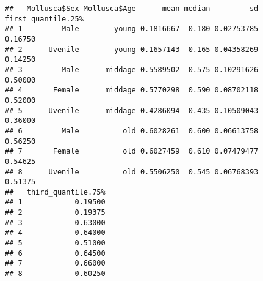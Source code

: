 \documentclass[
]{article}
\newenvironment{Shaded}{\begin{snugshade}}{\end{snugshade}}
\newcommand{\ControlFlowTok}[1]{\textcolor[rgb]{0.13,0.29,0.53}{\textbf{#1}}}
\newcommand{\DataTypeTok}[1]{\textcolor[rgb]{0.13,0.29,0.53}{#1}}
\newcommand{\FloatTok}[1]{\textcolor[rgb]{0.00,0.00,0.81}{#1}}
\newcommand{\KeywordTok}[1]{\textcolor[rgb]{0.13,0.29,0.53}{\textbf{#1}}}
\newcommand{\NormalTok}[1]{#1}
\newcommand{\OperatorTok}[1]{\textcolor[rgb]{0.81,0.36,0.00}{\textbf{#1}}}
\newcommand{\StringTok}[1]{\textcolor[rgb]{0.31,0.60,0.02}{#1}}
\begin{document}
\begin{Shaded}
\end{Shaded}

\begin{verbatim}
##   Mollusca$Sex Mollusca$Age      mean median         sd first_quantile.25%
## 1         Male        young 0.1816667  0.180 0.02753785            0.16750
## 2      Uvenile        young 0.1657143  0.165 0.04358269            0.14250
## 3         Male      middage 0.5589502  0.575 0.10291626            0.50000
## 4       Female      middage 0.5770298  0.590 0.08702118            0.52000
## 5      Uvenile      middage 0.4286094  0.435 0.10509043            0.36000
## 6         Male          old 0.6028261  0.600 0.06613758            0.56250
## 7       Female          old 0.6027459  0.610 0.07479477            0.54625
## 8      Uvenile          old 0.5506250  0.545 0.06768393            0.51375
##   third_quantile.75%
## 1            0.19500
## 2            0.19375
## 3            0.63000
## 4            0.64000
## 5            0.51000
## 6            0.64500
## 7            0.66000
## 8            0.60250
\end{verbatim}
\end{document}
